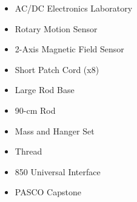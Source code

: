 \begin{itemize}
    \item AC/DC Electronics Laboratory
    \item Rotary Motion Sensor
    \item 2-Axis Magnetic Field Sensor
    \item Short Patch Cord (x8)
    \item Large Rod Base
    \item 90-cm Rod
    \item Mass and Hanger Set
    \item Thread
    \item 850 Universal Interface
    \item PASCO Capstone
\end{itemize}